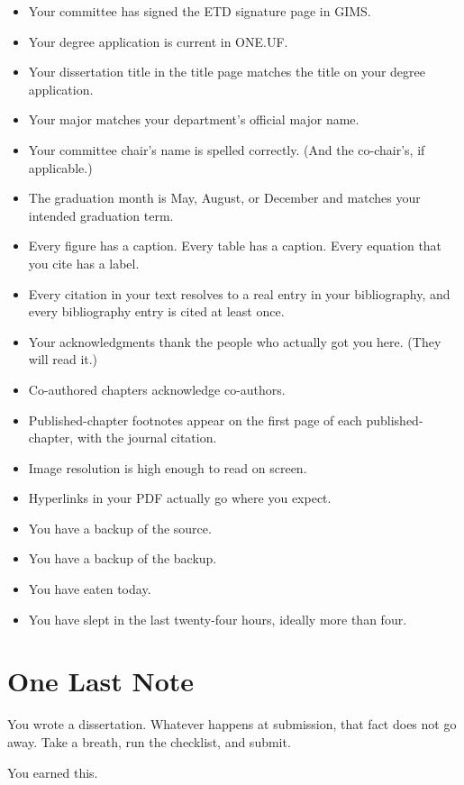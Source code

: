 \begin{itemize}
    \item Your committee has signed the ETD signature page in GIMS.
    \item Your degree application is current in ONE.UF.
    \item Your dissertation title in the title page matches the title
          on your degree application.
    \item Your major matches your department's official major name.
    \item Your committee chair's name is spelled correctly. (And the
          co-chair's, if applicable.)
    \item The graduation month is May, August, or December and matches
          your intended graduation term.
    \item Every figure has a caption. Every table has a caption. Every
          equation that you cite has a label.
    \item Every citation in your text resolves to a real entry in
          your bibliography, and every bibliography entry is cited at
          least once.
    \item Your acknowledgments thank the people who actually got you
          here. (They will read it.)
    \item Co-authored chapters acknowledge co-authors.
    \item Published-chapter footnotes appear on the first page of each
          published-chapter, with the journal citation.
    \item Image resolution is high enough to read on screen.
    \item Hyperlinks in your PDF actually go where you expect.
    \item You have a backup of the source.
    \item You have a backup of the backup.
    \item You have eaten today.
    \item You have slept in the last twenty-four hours, ideally more
          than four.
\end{itemize}

\section{One Last Note}

You wrote a dissertation. Whatever happens at submission, that fact
does not go away. Take a breath, run the checklist, and submit.

You earned this.
